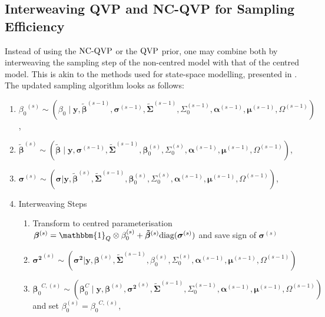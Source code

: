 \subsection{Interweaving QVP and NC-QVP for Sampling Efficiency}\label{app:asis}
Instead of using the $\operatorname{NC-QVP}$ or the $\operatorname{QVP}$ prior, one may combine both by interweaving the sampling step of the non-centred model with that of the centred model. This is akin to the methods used for state-space modelling, presented in \citet{bitto2019achieving}. 
%
The updated sampling algorithm looks as follows:
%
\begin{enumerate}
    \item ${{\beta}_0}^{(s)} \sim ({\beta}_0\mid \boldsymbol{y},\boldsymbol{\tilde{\beta}}^{(s-1)},\boldsymbol{\sigma}^{(s-1)},\boldsymbol{\tilde{\Sigma}}^{(s-1)},\Sigma_0^{(s-1)},\boldsymbol{\alpha}^{(s-1)},\boldsymbol{\mu}^{(s-1)},\Omega^{(s-1)} )$, 
    \item ${\boldsymbol{\tilde{\beta}}}^{(s)} \sim ({\boldsymbol{\tilde{\beta}}}\mid \boldsymbol{y},\boldsymbol{\sigma}^{(s-1)},\boldsymbol{\tilde{\Sigma}}^{(s-1)},\boldsymbol{{\beta}}_0^{(s)},\Sigma_0^{(s)},\boldsymbol{\alpha}^{(s-1)},\boldsymbol{\mu}^{(s-1)},\Omega^{(s-1)} )$, 
    \item $\boldsymbol{\sigma}^{(s)} \sim (\boldsymbol{\sigma} | \boldsymbol{y},\boldsymbol{\tilde{\beta}}^{(s)},\boldsymbol{\tilde{\Sigma}}^{(s-1)},\boldsymbol{{\beta}}_0^{(s)},\Sigma_0^{(s)},\boldsymbol{\alpha}^{(s-1)},\boldsymbol{\mu}^{(s-1)},\Omega^{(s-1)} )$, 
    \item Interweaving Steps
    \begin{enumerate}
        \item Transform to centred parameterisation $\boldsymbol{\beta}^{(s)} = \mathbbm{1}_{Q}  \otimes \beta_0^{(s)} + \boldsymbol{\tilde{\beta}}^{(s)}\text{diag}(\boldsymbol{\sigma}^{(s)})$ and save sign of $\boldsymbol{\sigma}^{(s)}$
        \item ${\boldsymbol{\sigma^2}}^{(s)} \sim (\boldsymbol{\sigma^2} | \boldsymbol{y},\boldsymbol{\beta}^{(s)},\boldsymbol{\tilde{\Sigma}}^{(s-1)},{{\beta}}_0^{(s)},\Sigma_0^{(s)},\boldsymbol{\alpha}^{(s-1)},\boldsymbol{\mu}^{(s-1)},\Omega^{(s-1)} )$
        \item ${\boldsymbol{\beta}_0}^{C,(s)} \sim (\boldsymbol{\beta}_0^{C}\mid \boldsymbol{y},\boldsymbol{{\beta}}^{(s)},{\boldsymbol{\sigma^2}}^{(s)},\boldsymbol{\tilde{\Sigma}}^{(s-1)},\Sigma_0^{(s-1)},\boldsymbol{\alpha}^{(s-1)},\boldsymbol{\mu}^{(s-1)},\Omega^{(s-1)} )$ and set $\beta_0^{(s)} = {{\beta}_0}^{C,(s)}$,  

\end{enumerate}
\end{enumerate}
